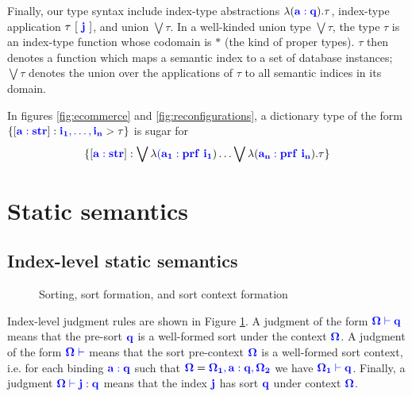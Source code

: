 \documentclass[sigplan,10pt,review,anonymous]{acmart}
\newcommand{\blum}[1]{\mathbf{\color{blue}{#1}}}
\begin{document}
Finally, our type syntax include index-type abstractions $\lambda (\blum{a : q}). \tau$, index-type application $\tau~[~\blum{j}~]$, and union $\bigvee \tau$. In a well-kinded union type $\bigvee \tau$, the type $\tau$ is an index-type function whose codomain is $\ast$ (the kind of proper types). $\tau$ then denotes a function which maps a semantic index to a set of database instances; $\bigvee \tau$ denotes the union over the applications of $\tau$ to all semantic indices in its domain. 
   
In figures \ref{fig:ecommerce} and \ref{fig:reconfigurations}, a dictionary type of the form $\{ [\blum{a :str}] : \blum{i_1, \ldots, i_n} > \tau \}$ is sugar for $$\{ [\blum{a :str}] : \bigvee \lambda \blum{(a_1 : prf~i_1}) \ldots \bigvee \lambda (\blum{a_n : prf~i_n}). \tau \}$$

\section{Static semantics}

\subsection{Index-level static semantics}

\begin{figure}
\caption{Sorting, sort formation, and sort context formation}
\label{fig:sorting}
\end{figure}

Index-level judgment rules are shown in Figure \ref{fig:sorting}. A judgment of the form $\blum{\Omega \vdash q}$ means that the pre-sort $\blum{q}$ is a well-formed sort under the context $\blum{\Omega}$. A judgment of the form $\blum{\Omega \vdash}$ means that the sort pre-context $\blum{\Omega}$ is a well-formed sort context, i.e. for each binding $\blum{a : q}$ such that $\blum{\Omega} = \blum{\Omega_1, a : q, \Omega_2}$ we have $\blum{\Omega_1 \vdash q}$. Finally, a judgment $\blum{\Omega \vdash j : q}$ means that the index $\blum{j}$ has sort $\blum{q}$ under context $\blum{\Omega}$.
\end{document}
